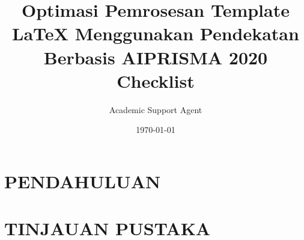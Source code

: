\documentclass{article}
\title{Optimasi Pemrosesan Template LaTeX Menggunakan Pendekatan Berbasis AI}
\author{Academic Support Agent}
\date{\today}
\begin{document}
\maketitle

\begin{abstract}

\end{abstract}

\chapter{PENDAHULUAN}


\chapter{TINJAUAN PUSTAKA}


\usepackage[utf8]{inputenc}

\usepackage{lscape}
\usepackage{longtable}
\usepackage[table]{xcolor}
\usepackage[margin=1cm]{geometry}
\usepackage{multicol,multirow}
\newenvironment{mytabular}[1][1]{%
  \renewcommand*{\arraystretch}{#1}%
  \tabular%
}{%
  \endtabular
}
\title{PRISMA 2020 Checklist}
\end{document}

